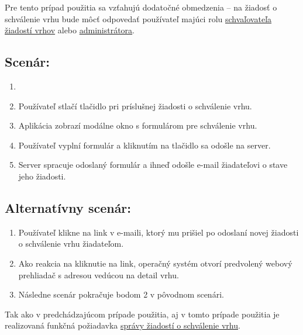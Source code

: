 Pre tento prípad použitia sa vzťahujú dodatočné obmedzenia -- na žiadosť o schválenie vrhu bude môcť odpovedať používateľ majúci rolu \hyperref[schvalovatel-vrhov]{schvaľovateľa žiadostí vrhov} alebo \hyperref[administrator]{administrátora}.

\pagebreak 
\subsection*{Scenár:}

\begin{enumerate}
	\item {}
	\item Používateľ stlačí tlačidlo  pri príslušnej žiadosti o schválenie vrhu.
	\item Aplikácia zobrazí modálne okno s formulárom pre schválenie vrhu.
	\item Používateľ vyplní formulár a kliknutím na tlačidlo  sa odošle na server.
	\item Server spracuje odoslaný formulár a ihneď odošle e-mail žiadateľovi o stave jeho žiadosti.
\end{enumerate}

\subsection*{Alternatívny scenár:}

\begin{enumerate}
	\item Používateľ klikne na link v e-maili, ktorý mu prišiel po odoslaní novej žiadosti o schválenie vrhu žiadateľom.
	\item Ako reakcia na kliknutie na link, operačný systém otvorí predvolený webový prehliadač s adresou vedúcou na detail vrhu.
	\item Následne scenár pokračuje bodom 2 v pôvodnom scenári.
\end{enumerate}

Tak ako v predchádzajúcom prípade použitia, aj v tomto prípade použitia je realizovaná funkčná požiadavka \hyperref[sprava-ziadosti-o-schvalenie-vrhu]{správy žiadostí o schválenie vrhu}.
	
